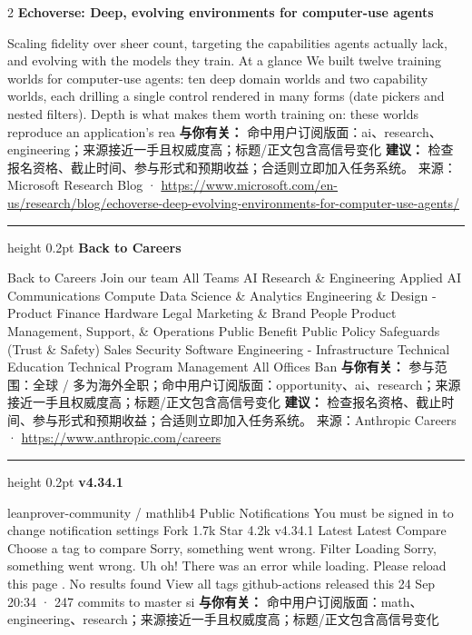\documentclass[10.5pt]{ctexart}
\begin{document}
\begin{multicols}{2}
{\large\bfseries Echoverse: Deep, evolving environments for computer-use agents}\par
Scaling fidelity over sheer count, targeting the capabilities agents actually lack, and evolving with the models they train. At a glance We built twelve training worlds for computer-use agents: ten deep domain worlds and two capability worlds, each drilling a single control rendered in many forms (date pickers and nested filters). Depth is what makes them worth training on: these worlds reproduce an application’s rea
\textbf{与你有关：} 命中用户订阅版面：ai、research、engineering；来源接近一手且权威度高；标题/正文包含高信号变化
\textbf{建议：} 检查报名资格、截止时间、参与形式和预期收益；合适则立即加入任务系统。
{\footnotesize\color{ormuted} 来源：Microsoft Research Blog · \url{https://www.microsoft.com/en-us/research/blog/echoverse-deep-evolving-environments-for-computer-use-agents/}}
\vspace{2mm}
\hrule height 0.2pt
\vspace{2mm}
{\large\bfseries Back to Careers}\par
Back to Careers Join our team All Teams AI Research \& Engineering Applied AI Communications Compute Data Science \& Analytics Engineering \& Design - Product Finance Hardware Legal Marketing \& Brand People Product Management, Support, \& Operations Public Benefit Public Policy Safeguards (Trust \& Safety) Sales Security Software Engineering - Infrastructure Technical Education Technical Program Management All Offices Ban
\textbf{与你有关：} 参与范围：全球 / 多为海外全职；命中用户订阅版面：opportunity、ai、research；来源接近一手且权威度高；标题/正文包含高信号变化
\textbf{建议：} 检查报名资格、截止时间、参与形式和预期收益；合适则立即加入任务系统。
{\footnotesize\color{ormuted} 来源：Anthropic Careers · \url{https://www.anthropic.com/careers}}
\vspace{2mm}
\hrule height 0.2pt
\vspace{2mm}
{\large\bfseries v4.34.1}\par
leanprover-community / mathlib4 Public Notifications You must be signed in to change notification settings Fork 1.7k Star 4.2k v4.34.1 Latest Latest Compare Choose a tag to compare Sorry, something went wrong. Filter Loading Sorry, something went wrong. Uh oh! There was an error while loading. Please reload this page . No results found View all tags github-actions released this 24 Sep 20:34 · 247 commits to master si
\textbf{与你有关：} 命中用户订阅版面：math、engineering、research；来源接近一手且权威度高；标题/正文包含高信号变化

\end{multicols}
\end{document}
